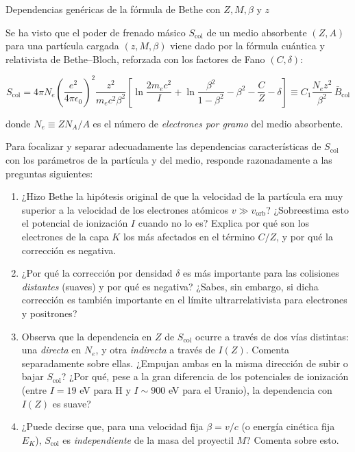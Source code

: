 \begin{Ejercicio}{Dependencias genéricas de la fórmula de Bethe con $Z, M, \beta$ y $z$} \label{Ej:02.04}
    

Se ha visto que el poder de frenado másico $S_\text{col}$ de un medio absorbente $(Z,A)$ para una 
partícula cargada $(z, M, \beta)$ viene dado por la fórmula cuántica y relativista de Bethe--Bloch, 
reforzada con los factores de Fano $(C,\delta)$:

\[
S_\text{col} = 4\pi N_e \left( \frac{e^2}{4\pi \epsilon_0} \right)^2 
\frac{z^2}{m_e c^2 \beta^2} 
\left[ \ln \frac{2 m_e c^2}{I} + \ln \frac{\beta^2}{1 - \beta^2} - \beta^2 - \frac{C}{Z} - \delta \right]
\equiv C_1 \frac{N_e z^2}{\beta^2} \, \bar{B}_\text{col}
\]

donde $N_e \equiv ZN_A/A$ es el número de \emph{electrones por gramo} del medio absorbente.  

Para focalizar y separar adecuadamente las dependencias características de $S_\text{col}$ con los  parámetros de la partícula y del medio, responde razonadamente a las preguntas siguientes:

\begin{enumerate}[label=\alph*)]

\item ¿Hizo Bethe la hipótesis original de que la velocidad de la partícula era muy superior a la 
velocidad de los electrones atómicos $v \gg v_\text{orb}$?  
¿Sobreestima esto el potencial de ionización $I$ cuando no lo es?  
Explica por qué son los electrones de la capa $K$ los más afectados en el término $C/Z$, y por qué la corrección es negativa.

\item ¿Por qué la corrección por densidad $\delta$ es más importante para las colisiones 
\emph{distantes} (suaves) y por qué es negativa?  
¿Sabes, sin embargo, si dicha corrección es también importante en el límite ultrarrelativista para electrones y positrones?

\item Observa que la dependencia en $Z$ de $S_\text{col}$ ocurre a través de dos vías distintas: 
una \emph{directa} en $N_e$, y otra \emph{indirecta} a través de $I(Z)$.  
Comenta separadamente sobre ellas.  
¿Empujan ambas en la misma dirección de subir o bajar $S_\text{col}$?  
¿Por qué, pese a la gran diferencia de los potenciales de ionización (entre $I=19$ eV para H y $I\sim 900$ eV para el Uranio), la dependencia con $I(Z)$ es suave?

\item ¿Puede decirse que, para una velocidad fija $\beta = v/c$ (o energía cinética fija $E_K$), 
$S_\text{col}$ es \emph{independiente} de la masa del proyectil $M$?  
Comenta sobre esto.


\end{enumerate}
\end{Ejercicio}

